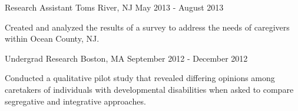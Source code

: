 \begin{cventries}
    {Research Assistant}
    {Toms River, NJ}
    {May 2013 - August 2013}
    {\begin{cvitems}
        \item{Created and analyzed the results of a 
            {survey} to address the needs of caregivers within Ocean County, NJ.}
    \end{cvitems}}
    \vspace*{0.2cm}
    
    {Undergrad Research}
    {Boston, MA}
    {September 2012 - December 2012}
    {\begin{cvitems}
        \item{Conducted a qualitative 
            {pilot study} that revealed differing opinions among caretakers of
            individuals with developmental disabilities when asked to compare
            segregative and integrative approaches.}
    \end{cvitems}}

\end{cventries}
